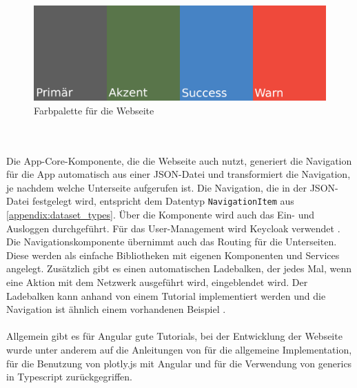 \begin{figure}[h!]
\centering
\includegraphics[scale=0.6]{gfx/palette.png}
\caption{Farbpalette für die Webseite}
\label{fig:palette}
\end{figure}
\\\\Die App-Core-Komponente, die die Webseite auch nutzt, generiert die Navigation für die App automatisch aus einer JSON-Datei und transformiert die Navigation, je nachdem welche Unterseite aufgerufen ist. Die Navigation, die in der JSON-Datei festgelegt wird, entspricht dem Datentyp \texttt{NavigationItem} aus \ref{appendix:dataset_types}. Über die Komponente wird auch das Ein- und Ausloggen durchgeführt. Für das User-Management wird Keycloak verwendet \cite{KeycloakAuthorsTheLinuxFoundation.2023}. Die Navigationskomponente übernimmt auch das Routing für die Unterseiten. Diese werden als einfache Bibliotheken mit eigenen Komponenten und Services angelegt. Zusätzlich gibt es einen automatischen Ladebalken, der jedes Mal, wenn eine Aktion mit dem Netzwerk ausgeführt wird, eingeblendet wird. Der Ladebalken kann anhand von einem Tutorial implementiert werden \cite{KeithStrickland.2020} und die Navigation ist ähnlich einem vorhandenen Beispiel \cite{sahilshah.2023}.
\\\\ 
Allgemein gibt es für Angular gute Tutorials, bei der Entwicklung der Webseite wurde unter anderem auf die Anleitungen von \cite{Angular.2022} für die allgemeine Implementation, \cite{DavidAkim.2022} für die Benutzung von plotly.js mit Angular und \cite{JonathanCardoso.2021} für die Verwendung von generics in Typescript zurückgegriffen.
